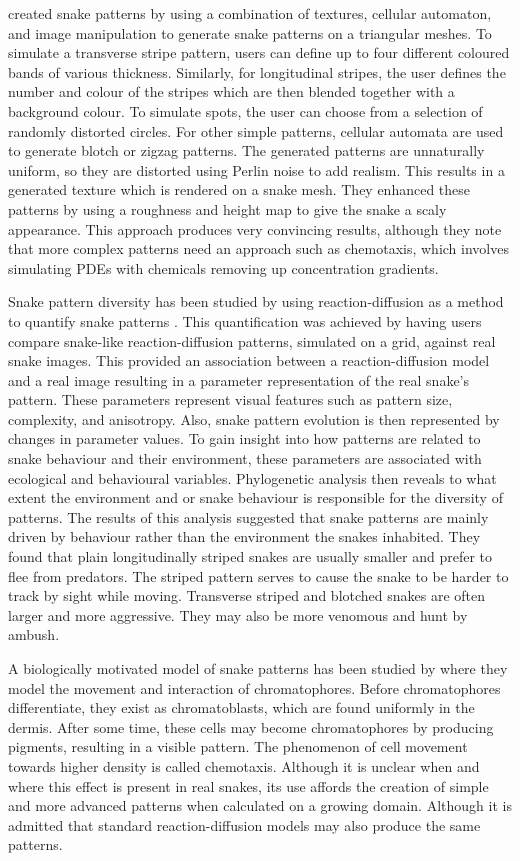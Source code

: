 \citet{pinheiro2017} created snake patterns by using a combination of textures, cellular automaton, and image manipulation to generate snake patterns on a triangular meshes. To simulate a transverse stripe pattern, users can define up to four different coloured bands of various thickness. Similarly, for longitudinal stripes, the user defines the number and colour of the stripes which are then blended together with a background colour. To simulate spots, the user can choose from a selection of randomly distorted circles. For other simple patterns, cellular automata are used to generate blotch or zigzag patterns. The generated patterns are unnaturally uniform, so they are distorted using Perlin noise to add realism. This results in a generated texture which is rendered on a snake mesh. They enhanced these patterns by using a roughness and height map to give the snake a scaly appearance. This approach produces very convincing results, although they note that more complex patterns need an approach such as chemotaxis, which involves simulating PDEs with chemicals removing up concentration gradients.

Snake pattern diversity has been studied by using reaction-diffusion as a method to quantify snake patterns \citep{Allen2013}. This quantification was achieved by having users compare snake-like reaction-diffusion patterns, simulated on a grid, against real snake images. This provided an association between a reaction-diffusion model and a real image resulting in a parameter representation of the real snake’s pattern. These parameters represent visual features such as pattern size, complexity, and anisotropy. Also, snake pattern evolution is then represented by changes in parameter values. To gain insight into how patterns are related to snake behaviour and their environment, these parameters are associated with ecological and behavioural variables. Phylogenetic analysis then reveals to what extent the environment and or  snake behaviour is responsible for the diversity of patterns. The results of this analysis suggested that snake patterns are mainly driven by behaviour rather than the environment the snakes inhabited. They found that plain longitudinally striped snakes are usually smaller and prefer to flee from predators. The striped pattern serves to cause the snake to be harder to track by sight while moving. Transverse striped and blotched snakes are often larger and more aggressive. They may also be more venomous and hunt by ambush.

A biologically motivated model of snake patterns has been studied by \citep{MURRAY1991} where they model the movement and interaction of chromatophores. Before chromatophores differentiate, they exist as chromatoblasts, which are found uniformly in the dermis. After some time, these cells may become chromatophores by producing pigments, resulting in a visible pattern. The phenomenon of cell movement towards higher density is called chemotaxis. Although it is unclear when and where this effect is present in real snakes, its use affords the creation of simple and more advanced patterns when calculated on a growing domain. Although it is admitted that standard reaction-diffusion models may also produce the same patterns.

